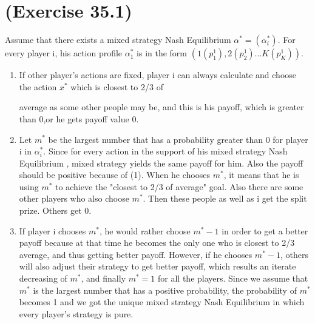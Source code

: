 \documentclass[a4paper,12pt]{article}
\newcommand{\NE}{Nash Equilibrium }
\begin{document}
\section{(Exercise 35.1)}
Assume that there exists a mixed strategy \NE
$\alpha^*=(\alpha_i^*)$. For every player i, his action profile
$\alpha^*_1$ is in the form $(1(p_1^1),2(p_2^1)\ldots K(p_K^1))$.
\begin{enumerate}
\item If other player's actions are fixed, player i can always
calculate and choose the action $x^*$ which is closest to 2/3 of

average as some other people may be, and this is his payoff, which
is greater than 0,or he gets payoff value 0.
\item Let $m^*$ be the largest number that has a probability greater
than 0 for player i in $\alpha_i^*$. Since for every action in the
support of his mixed strategy \NE, mixed strategy yields the same
payoff for him. Also the payoff should be positive because of (1).
When he chooses $m^*$, it means that he is using $m^*$ to achieve
the "closest to 2/3 of average" goal. Also there are some other
players who also choose $m^*$. Then these people as well as i get
the split prize. Others get 0.
\item If player i chooses $m^*$, he would rather choose $m^*-1$ in order to
get a better payoff because at that time he becomes the only one who
is closest to 2/3 average, and thus getting better payoff. However,
if he chooses $m^*-1$, others will also adjust their strategy to get
better payoff, which results an iterate decreasing of $m^*$, and
finally $m^*=1$ for all the players. Since we assume that $m^*$ is
the largest number that has a positive probability, the probability
of $m^*$ becomes 1 and we got the unique mixed strategy \NE in which
every player's strategy is pure.
\end{enumerate}
\end{document}
